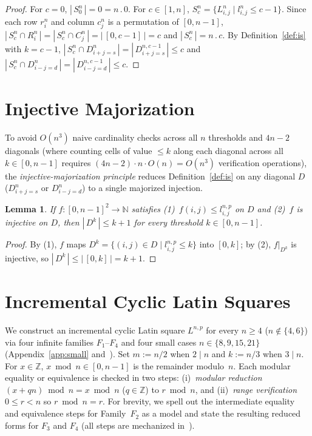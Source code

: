 \documentclass[10pt,a4paper]{article}
\newtheorem{lemma}[theorem]{Lemma}
\theoremstyle{remark}
\begin{document}
\begin{proof}
For $c = 0$, $|\,S^n_0\,| = 0 = n\,.\,0$. For $c \in [1,n]$,
$S^n_c = \{L^n_{i,j} \mid l^n_{i,j} \le c - 1\}$. Since each row $r^n_i$ and column $c^n_j$ is a
permutation of $[0,n-1]$, $|\,S^n_c \cap R^n_i\,| = |\,S^n_c \cap C^n_j\,| = |\,[0,c-1]\,| = c$ and
$|\,S^n_c\,| = n\,.\,c$. By Definition~\ref{def:is} with $k = c - 1$,
$|\,S^n_c \cap D^n_{i+j=s}\,| = |\,D^{n,c-1}_{i+j=s}\,| \le c$ and
$|\,S^n_c \cap D^n_{i-j=d}\,| = |\,D^{n,c-1}_{i-j=d}\,| \le c$.
\end{proof}

\section{Injective Majorization}\label{sec:inj-maj}

To avoid $O(n^3)$ naive cardinality checks across all $n$ thresholds and $4n - 2$ diagonals (where
counting cells of value $\le k$ along each diagonal across all $k \in [0,n-1]$ requires
$(4n - 2) \cdot n \cdot O(n) = O(n^3)$ verification operations), the \emph{injective-majorization
principle} reduces Definition~\ref{def:is} on any diagonal $D$ ($D^n_{i+j=s}$ or $D^n_{i-j=d}$) to a
single majorized injection.

\begin{lemma}\label{lem:inj-maj}
If $f : [0,n-1]^2 \to \mathbb{N}$ satisfies (1)~$f(i,j) \le l^{n,p}_{i,j}$ on $D$ and (2)~$f$ is
injective on $D$, then $|\,D^k\,| \le k + 1$ for every threshold $k \in [0,n-1]$.
\end{lemma}

\begin{proof}
By (1), $f$ maps $D^k = \{(i,j) \in D \mid l^{n,p}_{i,j} \le k\}$ into $[0,k]$; by (2), $f|_{D^k}$ is
injective, so $|\,D^k\,| \le |\,[0,k]\,| = k + 1$.
\end{proof}

\section{Incremental Cyclic Latin Squares}

We construct an incremental cyclic Latin square $L^{n,p}$ for every $n \ge 4$ ($n \notin \{4,6\}$) via
four infinite families $F_1$--$F_4$ and four small cases $n \in \{8, 9, 15, 21\}$
(Appendix~\ref{app:small} and~\cite{PalomarLean,CompanionRepo}). Set $m := n/2$ when $2 \mid n$ and
$k := n/3$ when $3 \mid n$. For $x \in \mathbb{Z}$, $x \bmod n \in [0,n-1]$ is the remainder
modulo~$n$. Each modular equality or equivalence is checked in two steps: (i)~\emph{modular reduction}
$(x + qn) \bmod n = x \bmod n$ ($q \in \mathbb{Z}$) to $r \bmod n$, and (ii)~\emph{range verification}
$0 \le r < n$ so $r \bmod n = r$. For brevity, we spell out the intermediate equality and equivalence
steps for Family~$F_2$ as a model and state the resulting reduced forms for $F_3$ and $F_4$ (all steps
are mechanized in~\cite{PalomarLean,CompanionRepo}).
\end{document}
